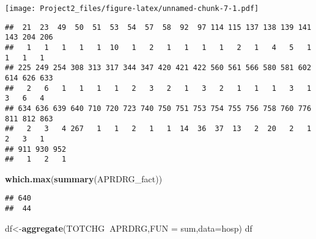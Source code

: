 \documentclass[
]{article}
\newenvironment{Shaded}{\begin{snugshade}}{\end{snugshade}}
\newcommand{\DataTypeTok}[1]{\textcolor[rgb]{0.13,0.29,0.53}{#1}}
\newcommand{\KeywordTok}[1]{\textcolor[rgb]{0.13,0.29,0.53}{\textbf{#1}}}
\newcommand{\NormalTok}[1]{#1}
\newcommand{\OperatorTok}[1]{\textcolor[rgb]{0.81,0.36,0.00}{\textbf{#1}}}
\begin{document}
\texttt{[image: Project2\_files/figure-latex/unnamed-chunk-7-1.pdf]}

\begin{Shaded}
\end{Shaded}

\begin{verbatim}
##  21  23  49  50  51  53  54  57  58  92  97 114 115 137 138 139 141 143 204 206 
##   1   1   1   1   1  10   1   2   1   1   1   1   2   1   4   5   1   1   1   1 
## 225 249 254 308 313 317 344 347 420 421 422 560 561 566 580 581 602 614 626 633 
##   2   6   1   1   1   1   2   3   2   1   3   2   1   1   1   3   1   3   6   4 
## 634 636 639 640 710 720 723 740 750 751 753 754 755 756 758 760 776 811 812 863 
##   2   3   4 267   1   1   2   1   1  14  36  37  13   2  20   2   1   2   3   1 
## 911 930 952 
##   1   2   1
\end{verbatim}

\begin{Shaded}
\begin{Highlighting}[]
\KeywordTok{which.max}\NormalTok{(}\KeywordTok{summary}\NormalTok{(APRDRG_fact)) }
\end{Highlighting}
\end{Shaded}

\begin{verbatim}
## 640 
##  44
\end{verbatim}

\begin{Shaded}
\begin{Highlighting}[]
\NormalTok{df<-}\KeywordTok{aggregate}\NormalTok{(TOTCHG}\OperatorTok{~}\NormalTok{APRDRG,}\DataTypeTok{FUN =}\NormalTok{ sum,}\DataTypeTok{data=}\NormalTok{hosp) }
\NormalTok{df }
\end{Highlighting}
\end{Shaded}
\end{document}
